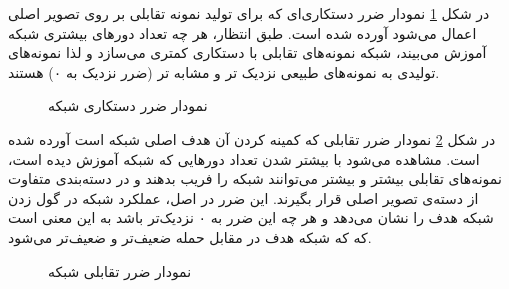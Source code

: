\newpage
در شکل 
\ref{perturbation_GAN_model_performance}
نمودار ضرر دستکاری‌ای که برای تولید نمونه‌ تقابلی بر روی تصویر اصلی اعمال می‌شود آورده شده است. طبق انتظار، هر چه تعداد دورهای بیشتری شبکه آموزش می‌بیند، شبکه 
نمونه‌های تقابلی با دستکاری کمتری می‌سازد و لذا نمونه‌های تولیدی به نمونه‌های طبیعی‌ نزدیک تر و مشابه تر (ضرر نزدیک به ۰) هستند.
\begin{figure}[H]
	\caption{نمودار ضرر دستکاری شبکه
		}
	\label{perturbation_GAN_model_performance}
\end{figure}

\newpage
در شکل 
\ref{adversarial_GAN_model_performance}
نمودار ضرر تقابلی‌ که کمینه کردن آن هدف اصلی شبکه است آورده شده است. مشاهده می‌شود با بیشتر شدن تعداد‌ دورهایی که شبکه آموزش دیده است، نمونه‌های تقابلی بیشتر و بیشتر می‌توانند شبکه را فریب بدهند و در دسته‌بندی متفاوت از دسته‌ی تصویر اصلی قرار بگیرند. این ضرر در اصل، عملکرد شبکه
در گول زدن شبکه هدف را نشان می‌دهد و هر چه این ضرر به ۰ نزدیک‌تر باشد به این معنی است که که شبکه هدف در مقابل حمله ضعیف‌تر و ضعیف‌تر می‌شود.
\begin{figure}[H]
	\caption{نمودار ضرر تقابلی شبکه
		}
	\label{adversarial_GAN_model_performance}
\end{figure}

